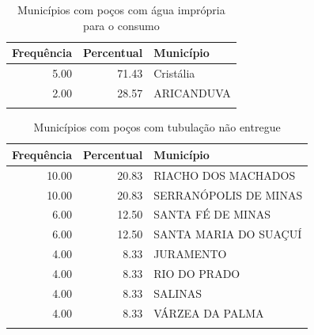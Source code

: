 \documentclass[a4paper, 12pt, openright, oneside, english, brazil, article]{abntex2}
\begin{document}
	
	
	\begin{scriptsize}
		\begin{longtable}{rrl}
			\caption{Municípios com poços com água imprópria para o consumo} \\ 
			\hline
			Frequência & Percentual & Município \\ 
			\hline
			5.00 & 71.43 & Cristália \\ 
			2.00 & 28.57 & ARICANDUVA \\ 
			\hline
			\hline
			\label{motivo2}
		\end{longtable}
	\end{scriptsize}


	
	\begin{scriptsize}
		\begin{longtable}{rrl}
			\caption{Municípios com poços com tubulação não entregue} \\ 
			\hline
			Frequência & Percentual & Município \\ 
			\hline
			10.00 & 20.83 & RIACHO DOS MACHADOS \\ 
			10.00 & 20.83 & SERRANÓPOLIS DE MINAS \\ 
			6.00 & 12.50 & SANTA FÉ DE MINAS \\ 
			6.00 & 12.50 & SANTA MARIA DO SUAÇUÍ \\ 
			4.00 & 8.33 & JURAMENTO \\ 
			4.00 & 8.33 & RIO DO PRADO \\ 
			4.00 & 8.33 & SALINAS \\ 
			4.00 & 8.33 & VÁRZEA DA PALMA \\ 
			\hline
			\hline
			\label{motivo3}
		\end{longtable}
	\end{scriptsize}

	
\end{document}
